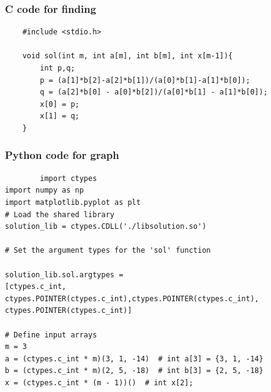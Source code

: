 \documentclass{beamer}
\begin{document}
 
\begin{frame}
\frametitle{C code for finding }
\begin{verbatim}
    #include <stdio.h>

    void sol(int m, int a[m], int b[m], int x[m-1]){
        int p,q;
        p = (a[1]*b[2]-a[2]*b[1])/(a[0]*b[1]-a[1]*b[0]);
        q = (a[2]*b[0] - a[0]*b[2])/(a[0]*b[1] - a[1]*b[0]);
        x[0] = p;
        x[1] = q;
    }
    \end{verbatim}
\end{frame}
\begin{frame}
    \frametitle{Python code for graph}
    \begin{standalone}
        \begin{verbatim}
        import ctypes
import numpy as np
import matplotlib.pyplot as plt
# Load the shared library
solution_lib = ctypes.CDLL('./libsolution.so')

# Set the argument types for the 'sol' function

solution_lib.sol.argtypes = 
[ctypes.c_int, ctypes.POINTER(ctypes.c_int),ctypes.POINTER(ctypes.c_int), ctypes.POINTER(ctypes.c_int)]

# Define input arrays
m = 3
a = (ctypes.c_int * m)(3, 1, -14)  # int a[3] = {3, 1, -14}
b = (ctypes.c_int * m)(2, 5, -18)  # int b[3] = {2, 5, -18}
x = (ctypes.c_int * (m - 1))()  # int x[2];
        \end{verbatim}
    \end{standalone}
    \end{frame}
\end{document}
